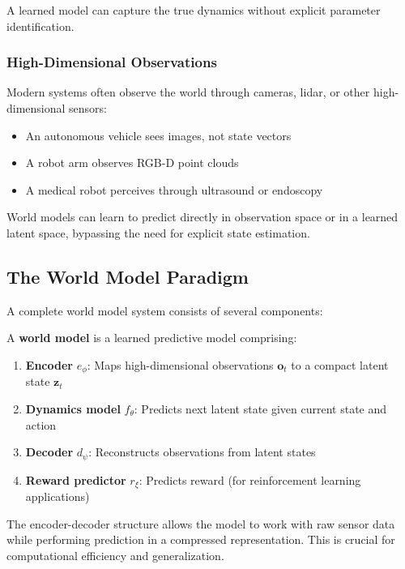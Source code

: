 A learned model can capture the true dynamics without explicit parameter identification.

\subsubsection{High-Dimensional Observations}

Modern systems often observe the world through cameras, lidar, or other high-dimensional sensors:
\begin{itemize}
    \item An autonomous vehicle sees images, not state vectors
    \item A robot arm observes RGB-D point clouds
    \item A medical robot perceives through ultrasound or endoscopy
\end{itemize}

World models can learn to predict directly in observation space or in a learned latent space, bypassing the need for explicit state estimation.

\subsection{The World Model Paradigm}

A complete world model system consists of several components:

\begin{definition}
A \textbf{world model} is a learned predictive model comprising:
\begin{enumerate}
    \item \textbf{Encoder} $e_\phi$: Maps high-dimensional observations $\mathbf{o}_t$ to a compact latent state $\mathbf{z}_t$
    \item \textbf{Dynamics model} $f_\theta$: Predicts next latent state given current state and action
    \item \textbf{Decoder} $d_\psi$: Reconstructs observations from latent states
    \item \textbf{Reward predictor} $r_\xi$: Predicts reward (for reinforcement learning applications)
\end{enumerate}
\end{definition}

The encoder-decoder structure allows the model to work with raw sensor data while performing prediction in a compressed representation. This is crucial for computational efficiency and generalization.

